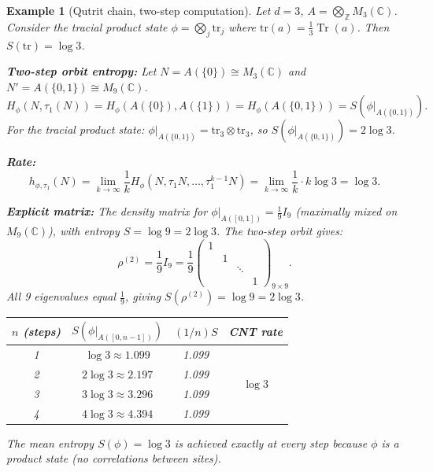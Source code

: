\documentclass[12pt,a4paper]{article}
\newtheorem{example}[theorem]{Example}
\newcommand{\CC}{\mathbb{C}}
\newcommand{\ZZ}{\mathbb{Z}}
\newcommand{\Tr}{\operatorname{Tr}}
\newcommand{\Hphi}{H_{\phi}}
\begin{document}
\begin{example}[Qutrit chain, two-step computation]\label{ex:qutrit}
Let $d=3$, $A=\bigotimes_\ZZ M_3(\CC)$.
Consider the tracial product state $\phi=\bigotimes_j\mathrm{tr}_j$ where
$\mathrm{tr}(a)=\frac{1}{3}\Tr(a)$.  Then $S(\mathrm{tr})=\log 3$.

\textbf{Two-step orbit entropy:}
Let $N=A(\{0\})\cong M_3(\CC)$ and $N'=A(\{0,1\})\cong M_9(\CC)$.
\begin{equation}
  \Hphi(N, \tau_1(N))
  = \Hphi(A(\{0\}),A(\{1\}))
  = \Hphi(A(\{0,1\}))
  = S(\phi|_{A(\{0,1\})}).
\end{equation}
For the tracial product state: $\phi|_{A(\{0,1\})}=\mathrm{tr}_3\otimes\mathrm{tr}_3$,
so $S(\phi|_{A(\{0,1\})})=2\log 3$.

\textbf{Rate:}
\begin{equation}
  h_{\phi,\tau_1}(N) = \lim_{k\to\infty}\frac{1}{k}\Hphi(N,\tau_1 N,\ldots,\tau_1^{k-1} N)
  = \lim_{k\to\infty}\frac{1}{k}\cdot k\log 3 = \log 3.
\end{equation}

\textbf{Explicit matrix:}
The density matrix for $\phi|_{A([0,1])}=\frac{1}{9}I_9$ (maximally mixed on $M_9(\CC)$),
with entropy $S = \log 9 = 2\log 3$.  The two-step orbit gives:
\begin{equation}\label{eq:qutrit_2step}
  \rho^{(2)} = \frac{1}{9}I_9
  = \frac{1}{9}\begin{pmatrix}
    1 & & & \\
    & 1 & & \\
    & & \ddots & \\
    & & & 1
  \end{pmatrix}_{9\times 9}.
\end{equation}
All 9 eigenvalues equal $\frac{1}{9}$, giving $S(\rho^{(2)})=\log 9=2\log 3$.

\begin{center}
\begin{tabular}{@{}cccc@{}}
\toprule
$n$ (steps) & $S(\phi|_{A([0,n-1])})$ & $(1/n)S$ & CNT rate \\
\midrule
1 & $\log 3 \approx 1.099$ & 1.099 & \multirow{4}{*}{$\log 3$} \\
2 & $2\log 3 \approx 2.197$ & 1.099 & \\
3 & $3\log 3 \approx 3.296$ & 1.099 & \\
4 & $4\log 3 \approx 4.394$ & 1.099 & \\
\bottomrule
\end{tabular}
\end{center}

The mean entropy $S(\phi)=\log 3$ is achieved exactly at every step because $\phi$
is a product state (no correlations between sites).
\end{example}
\end{document}
